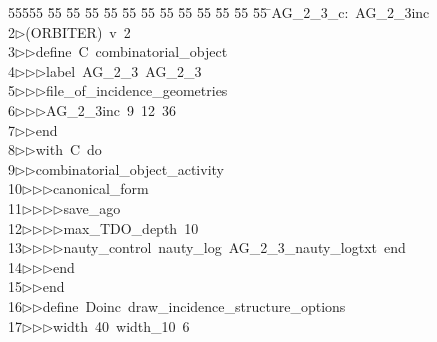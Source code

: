 %
%
\begin{tabbing}
55555 \= 55 \= 55 \= 55 \= 55 \= 55 \= 55 \= 55 \= 55 \= 55 \= 55 \= 55 \= 55 \= \>AG\_2\_3\_c:\ AG\_2\_3inc\\[0pt]
2\>$\triangleright$\>(ORBITER)\ v\ 2\ \\[0pt]
3\>$\triangleright$\>$\triangleright$\>define\ C\ combinatorial\_object\ \\[0pt]
4\>$\triangleright$\>$\triangleright$\>$\triangleright$\>label\ AG\_2\_3\ AG\_2\_3\ \\[0pt]
5\>$\triangleright$\>$\triangleright$\>$\triangleright$\>file\_of\_incidence\_geometries\ \\[0pt]
6\>$\triangleright$\>$\triangleright$\>$\triangleright$\>AG\_2\_3inc\ 9\ 12\ 36\ \\[0pt]
7\>$\triangleright$\>$\triangleright$\>end\ \\[0pt]
8\>$\triangleright$\>$\triangleright$\>with\ C\ do\ \\[0pt]
9\>$\triangleright$\>$\triangleright$\>combinatorial\_object\_activity\ \\[0pt]
10\>$\triangleright$\>$\triangleright$\>$\triangleright$\>canonical\_form\ \\[0pt]
11\>$\triangleright$\>$\triangleright$\>$\triangleright$\>$\triangleright$\>save\_ago\ \\[0pt]
12\>$\triangleright$\>$\triangleright$\>$\triangleright$\>$\triangleright$\>max\_TDO\_depth\ 10\ \\[0pt]
13\>$\triangleright$\>$\triangleright$\>$\triangleright$\>$\triangleright$\>nauty\_control\ nauty\_log\ AG\_2\_3\_nauty\_logtxt\ end\ \\[0pt]
14\>$\triangleright$\>$\triangleright$\>$\triangleright$\>end\ \\[0pt]
15\>$\triangleright$\>$\triangleright$\>end\ \\[0pt]
16\>$\triangleright$\>$\triangleright$\>define\ Doinc\ draw\_incidence\_structure\_options\ \\[0pt]
17\>$\triangleright$\>$\triangleright$\>$\triangleright$\>width\ 40\ width\_10\ 6\ \\[0pt]

\end{tabbing}
